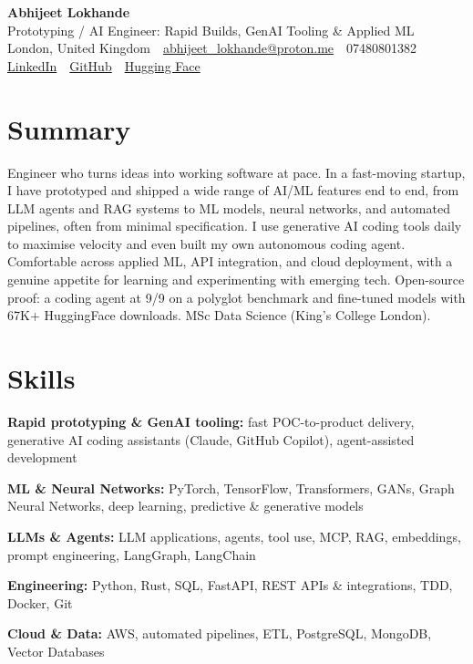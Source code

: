 \documentclass[10pt,a4paper]{article}
\newcommand{\sep}{\,\textcolor{accent!60}{\textbar}\,}
\begin{document}
\begin{center}
  {\fontsize{24}{26}\selectfont\bfseries Abhijeet Lokhande}\\[3pt]
  {\color{accent}\large Prototyping / AI Engineer: Rapid Builds, GenAI Tooling \& Applied ML}\\[5pt]
  {\small
    London, United Kingdom \sep
    \href{mailto:abhijeet_lokhande@proton.me}{abhijeet\_lokhande@proton.me} \sep
    07480801382 \\[2pt]
    \href{https://www.linkedin.com/in/ablds/}{LinkedIn} \sep
    \href{https://github.com/abhijeetscode}{GitHub} \sep
    \href{https://huggingface.co/ab-ai}{Hugging Face}
  }
\end{center}
\vspace{2pt}

\section{Summary}
Engineer who turns ideas into working software at pace. In a fast-moving startup, I have prototyped and shipped a wide range of AI/ML features end to end, from LLM agents and RAG systems to ML models, neural networks, and automated pipelines, often from minimal specification. I use generative AI coding tools daily to maximise velocity and even built my own autonomous coding agent. Comfortable across applied ML, API integration, and cloud deployment, with a genuine appetite for learning and experimenting with emerging tech. Open-source proof: a coding agent at 9/9 on a polyglot benchmark and fine-tuned models with 67K+ HuggingFace downloads. MSc Data Science (King's College London).

\section{Skills}
\begin{tight}
  \item[\textcolor{accent}{\small$\bullet$}] \textbf{Rapid prototyping \& GenAI tooling:} fast POC-to-product delivery, generative AI coding assistants (Claude, GitHub Copilot), agent-assisted development
  \item[\textcolor{accent}{\small$\bullet$}] \textbf{ML \& Neural Networks:} PyTorch, TensorFlow, Transformers, GANs, Graph Neural Networks, deep learning, predictive \& generative models
  \item[\textcolor{accent}{\small$\bullet$}] \textbf{LLMs \& Agents:} LLM applications, agents, tool use, MCP, RAG, embeddings, prompt engineering, LangGraph, LangChain
  \item[\textcolor{accent}{\small$\bullet$}] \textbf{Engineering:} Python, Rust, SQL, FastAPI, REST APIs \& integrations, TDD, Docker, Git
  \item[\textcolor{accent}{\small$\bullet$}] \textbf{Cloud \& Data:} AWS, automated pipelines, ETL, PostgreSQL, MongoDB, Vector Databases
\end{tight}
\end{document}
